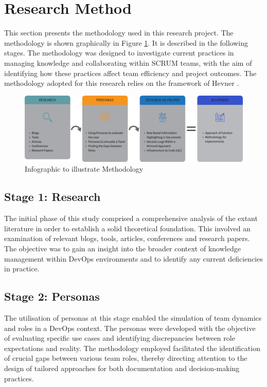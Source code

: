\section{Research Method}

This section presents the methodology used in this research project. The methodology is shown graphically in Figure \ref{fig:methodology:graphic:1}. It is described in the following stages. The methodology was designed to investigate current practices in managing knowledge and collaborating within \ac{SCRUM} teams, with the aim of identifying how these practices affect team efficiency and project outcomes. The methodology adopted for this research relies on the framework of Hevner \cite{Hevner2004}.

\begin{figure}[h!]
\centering
\includegraphics[width=\linewidth]{Images/methodic.jpg}
\caption{Infographic to illustrate Methodology}
\label{fig:methodology:graphic:1}
\end{figure}

\subsection*{Stage 1: Research}
The initial phase of this study comprised a comprehensive analysis of the extant literature in order to establish a solid theoretical foundation. This involved an examination of relevant blogs, tools, articles, conferences and research papers. The objective was to gain an insight into the broader context of knowledge management within \ac{DevOps} environments and to identify any current deficiencies in practice.

\subsection*{Stage 2: Personas}
The utilisation of personas at this stage enabled the simulation of team dynamics and roles in a \ac{DevOps} context. The personas were developed with the objective of evaluating specific use cases and identifying discrepancies between role expectations and reality. The methodology employed facilitated the identification of crucial gaps between various team roles, thereby directing attention to the design of tailored approaches for both documentation and decision-making practices.

